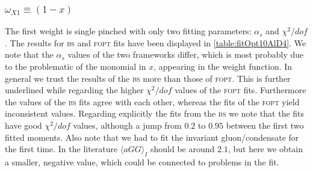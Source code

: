 \documentclass[../../index.tex]{subfiles}
\begin{document}
\subsubsection{\(\omega_{X1} \equiv (1-x)\)}
The first weight is single pinched with only two fitting parameters:
\(\alpha_s\) and \(\chi^2/dof\). The results for \textsc{bs} and \textsc{fopt}
fits have been displayed in \cref{table:fitOpt10AlD4}. We note that the
\(\alpha_s\) values of the two frameworks differ, which is most probably due to
the problematic of the monomial in \(x\), appearing in the weight function. In
general we trust the results of the \textsc{bs} more than those of
\textsc{fopt}. This is further underlined while regarding the higher
\(\chi^2/dof\) values of the \textsc{fopt} fits. Furthermore the values of the
\textsc{bs} fits agree with each other, whereas the fits of the \textsc{fopt}
yield inconsistent values. Regarding explicitly the fits from the \textsc{bs} we
note that the fits have good \(\chi^2/dof\) values, although a jump from \(0.2\)
to \(0.95\) between the first two fitted moments. Also note that we had to fit
the invariant gluon\-/condensate for the first time. In the literature \(\langle
aGG \rangle_I\) should be around \(2.1\), but here we obtain a smaller, negative
value, which could be connected to problems in the fit.
\end{document}
